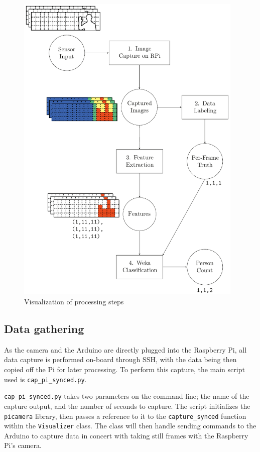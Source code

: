 \documentclass[../thesis/thesis.tex]{subfiles}
\begin{document}
\begin{figure}
\centering
\includegraphics[width=0.97\textwidth]{../diagrams/process-pics.pdf}
\caption{Visualization of processing steps}
\label{fig:methods:flowchart}
\end{figure}

\subsection{Data gathering}
As the camera and the Arduino are directly plugged into the Raspberry Pi, all data capture is performed on-board through SSH, with the data being then copied off the Pi for later processing. To perform this capture, the main script used is \texttt{cap\_pi\_synced.py}.

\texttt{cap\_pi\_synced.py} takes two parameters on the command line; the name of the capture output, and the number of seconds to capture. The script initializes the \texttt{picamera} library, then passes a reference to it to the \texttt{capture\_synced} function within the \texttt{Visualizer} class. The class will then handle sending commands to the Arduino to capture data in concert with taking still frames with the Raspberry Pi's camera.
\end{document}
